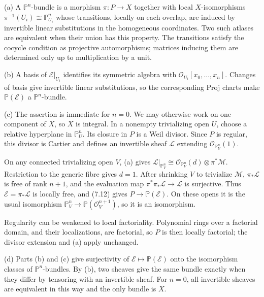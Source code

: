 (a) A $\mathbb P^n$-bundle is a morphism $\pi:P\to X$ together with local $X$-isomorphisms $\pi^{-1}(U_i)\cong\mathbb P^n_{U_i}$ whose transitions, locally on each overlap, are induced by invertible linear substitutions in the homogeneous coordinates. Two such atlases are equivalent when their union has this property. The transitions satisfy the cocycle condition as projective automorphisms; matrices inducing them are determined only up to multiplication by a unit.

(b) A basis of $\mathcal E|_{U_i}$ identifies its symmetric algebra with $\mathcal O_{U_i}[x_0,\ldots,x_n]$. Changes of basis give invertible linear substitutions, so the corresponding Proj charts make $\mathbb P(\mathcal E)$ a $\mathbb P^n$-bundle.

(c) The assertion is immediate for $n=0$. We may otherwise work on one component of $X$, so $X$ is integral. In a nonempty trivializing open $U$, choose a relative hyperplane in $\mathbb P^n_U$. Its closure in $P$ is a Weil divisor. Since $P$ is regular, this divisor is Cartier and defines an invertible sheaf $\mathcal L$ extending $\mathcal O_{\mathbb P^n_U}(1)$.

On any connected trivializing open $V$, (a) gives $\mathcal L|_{\mathbb P^n_V}\cong\mathcal O_{\mathbb P^n_V}(d)\otimes\pi^*\mathcal M$. Restriction to the generic fibre gives $d=1$. After shrinking $V$ to trivialize $\mathcal M$, $\pi_*\mathcal L$ is free of rank $n+1$, and the evaluation map $\pi^*\pi_*\mathcal L\to\mathcal L$ is surjective. Thus $\mathcal E=\pi_*\mathcal L$ is locally free, and (7.12) gives $P\to\mathbb P(\mathcal E)$. On these opens it is the usual isomorphism $\mathbb P^n_V\to\mathbb P(\mathcal O_V^{n+1})$, so it is an isomorphism.

Regularity can be weakened to local factoriality. Polynomial rings over a factorial domain, and their localizations, are factorial, so $P$ is then locally factorial; the divisor extension and (a) apply unchanged.

(d) Parts (b) and (c) give surjectivity of $\mathcal E\mapsto\mathbb P(\mathcal E)$ onto the isomorphism classes of $\mathbb P^n$-bundles. By (b), two sheaves give the same bundle exactly when they differ by tensoring with an invertible sheaf. For $n=0$, all invertible sheaves are equivalent in this way and the only bundle is $X$.
